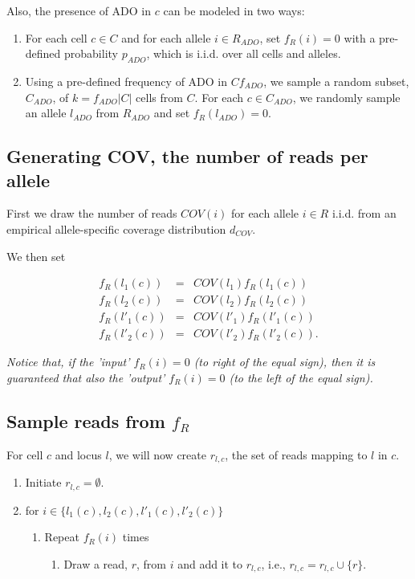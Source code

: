 \documentclass[a4paper,11pt]{article}
\begin{document}
Also, the presence of ADO in $c$ can be modeled in two ways:
\begin{enumerate}
\item For each cell $c \in C$ and for each allele $i\in R_{ADO}$, set
  $f_R(i)=0$ with a pre-defined probability $p_{ADO}$, which is
  i.i.d. over all cells and alleles.
\item Using a pre-defined frequency of ADO in
  $C$$f_{ADO}$, we sample a random subset,
  $C_{ADO}$, of $k=f_{ADO}|C|$ cells from $C$. For each $c\in
  C_{ADO}$, we randomly sample an allele $l_{ADO}$ from
  $R_{ADO}$ and set $f_R(l_{ADO})=0$.
\end{enumerate}


\subsection{Generating COV, the number of reads per allele}
\label{sec:gener-numb-reads}


First we draw the number of reads $COV(i)$ for each allele $i\in R$
i.i.d. from an empirical allele-specific coverage distribution $d_{COV}$.

We then set

\begin{eqnarray*}
  f_R(l_1(c)) &=& COV(l_1) f_R(l_1(c))\\
  f_R(l_2(c)) &=& COV(l_2) f_R(l_2(c))\\
  f_R(l'_1(c)) &=& COV(l'_1) f_R(l'_1(c))\\
  f_R(l'_2(c)) &=& COV(l'_2) f_R(l'_2(c)).
\end{eqnarray*}

\emph{Notice that, if the 'input' $f_R(i)=0$ (to right of the equal sign), then it is guaranteed that also the 'output' $f_R(i)=0$ (to the left of the equal sign).}

\subsection{Sample reads from $f_R$}
\label{sec:sample-reads-from}
For cell $c$ and locus $l$, we will now create $r_{l,c}$, the set of
reads mapping to $l$ in $c$.

\begin{enumerate}
\item Initiate $r_{l,c}=\emptyset$.
\item for $i\in \{l_1(c),l_2(c),l'_1(c),l'_2(c)\}$
  \begin{enumerate}
  \item Repeat $f_R(i)$ times
    \begin{enumerate}
    \item Draw a read, $r$, from $i$ and add it to $r_{l,c}$, i.e., $r_{l,c}=r_{l,c}\cup \{r\}$.
    \end{enumerate}
  \end{enumerate}
\end{enumerate}
\end{document}
